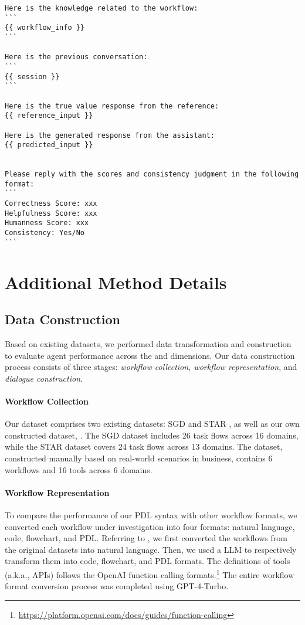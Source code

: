 \begin{envnew}
\begin{lstlisting}[language={}, caption=Prompt for turn-level evaluation]
Here is the knowledge related to the workflow: 
```
{{ workflow_info }}
```

Here is the previous conversation:
```
{{ session }}
```

Here is the true value response from the reference: 
{{ reference_input }}

Here is the generated response from the assistant: 
{{ predicted_input }}


Please reply with the scores and consistency judgment in the following format:
```
Correctness Score: xxx
Helpfulness Score: xxx
Humanness Score: xxx
Consistency: Yes/No
```
\end{lstlisting}

\section{Additional Method Details} \label{appendix:method_details}


\subsection{Data Construction} \label{subsec:data_construction}

Based on existing datasets, we performed data transformation and construction to evaluate agent performance across the \ofollow and \oflex dimensions. Our data construction process consists of three stages: \textit{workflow collection, workflow representation}, and \textit{dialogue construction}.

\paragraph{Workflow Collection}
Our dataset comprises two existing datasets: SGD \citep{SGD} and STAR \citep{STAR}, as well as our own constructed dataset, \dinhouse. The SGD dataset includes 26 task flows across 16 domains, while the STAR dataset covers 24 task flows across 13 domains. The \dinhouse dataset, constructed manually based on real-world scenarios in business,
contains 6 workflows and 16 tools across 6 domains.


\paragraph{Workflow Representation}
To compare the performance of our PDL syntax with other workflow formats, we converted each workflow 
under investigation
into four formats: natural language, code, flowchart, and PDL.
Referring to \citet{FlowBench}, we first converted the workflows from the original datasets into natural language.
Then, we used a LLM to respectively transform them into code, flowchart, and PDL formats.
The definitions of tools (a.k.a., APIs) follows the OpenAI function calling formats.\footnote{\url{https://platform.openai.com/docs/guides/function-calling}}
The entire workflow format conversion process was completed using GPT-4-Turbo.


\end{envnew}
